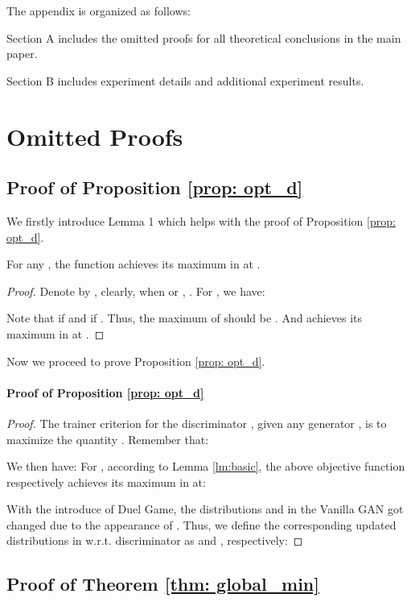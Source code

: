 The appendix is organized as follows:
\squishlist
    \item Section A includes the omitted proofs for all theoretical conclusions in the main paper.
    \item Section B includes experiment details and additional experiment results.
\squishend

\section{Omitted Proofs}

\subsection{Proof of Proposition \ref{prop: opt_d}}\label{app:p1}
We firstly introduce Lemma 1 which helps with the proof of Proposition \ref{prop: opt_d}.

\begin{lemma}\label{lm:basic}
For any , the function  achieves its maximum in  at .
\end{lemma}
\begin{proof}
Denote by , clearly, when  or , . For , we have:

Note that  if  and  if . Thus, the maximum of  should be . And  achieves its maximum in  at .
\end{proof}
Now we proceed to prove Proposition \ref{prop: opt_d}. 
\paragraph{\textbf{Proof of Proposition \ref{prop: opt_d}}}
\begin{proof}
The trainer criterion for the discriminator , given any generator , is to maximize the quantity . Remember that:

We then have:
{
}
For , according to Lemma \ref{lm:basic}, the above objective function respectively achieves its maximum in  at: 

With the introduce of Duel Game, the distributions  and  in the Vanilla GAN got changed due to the appearance of . Thus, we define the corresponding updated distributions in \PG{} w.r.t. discriminator  as  and , respectively:

\end{proof}

\subsection{Proof of Theorem \ref{thm: global_min}}

